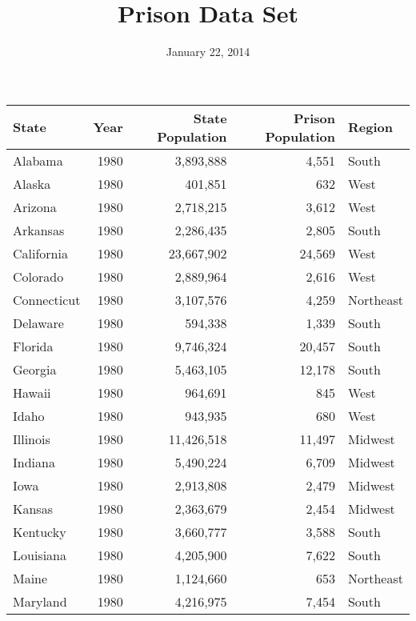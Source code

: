 \documentclass{exam}
\author{}
\date{January 22, 2014}
\title{Prison Data Set}
\begin{document}
    \centering
    \begin{tabular}{lrrrl}
      \toprule
      State          & Year & State Population & Prison Population & Region \\
      \midrule
      Alabama        & 1980 & 3,893,888        & 4,551             & South \\
      Alaska         & 1980 & 401,851          & 632               & West \\
      Arizona        & 1980 & 2,718,215        & 3,612             & West \\
      Arkansas       & 1980 & 2,286,435        & 2,805             & South \\
      California     & 1980 & 23,667,902       & 24,569            & West \\
      Colorado       & 1980 & 2,889,964        & 2,616             & West \\
      Connecticut    & 1980 & 3,107,576        & 4,259             & Northeast \\
      Delaware       & 1980 & 594,338          & 1,339             & South \\
      Florida        & 1980 & 9,746,324        & 20,457            & South \\
      Georgia        & 1980 & 5,463,105        & 12,178            & South \\
      Hawaii         & 1980 & 964,691          & 845               & West \\
      Idaho          & 1980 & 943,935          & 680               & West \\
      Illinois       & 1980 & 11,426,518       & 11,497            & Midwest \\
      Indiana        & 1980 & 5,490,224        & 6,709             & Midwest \\
      Iowa           & 1980 & 2,913,808        & 2,479             & Midwest \\
      Kansas         & 1980 & 2,363,679        & 2,454             & Midwest \\
      Kentucky       & 1980 & 3,660,777        & 3,588             & South \\
      Louisiana      & 1980 & 4,205,900        & 7,622             & South \\
      Maine          & 1980 & 1,124,660        & 653               & Northeast \\
      Maryland       & 1980 & 4,216,975        & 7,454             & South \\

\end{tabular}
\end{document}
